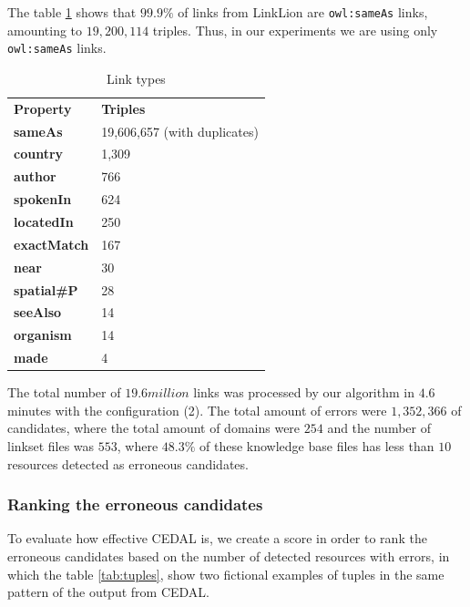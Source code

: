  The table \ref{tab:linkTypes} shows that $99.9 \%$ of links from LinkLion are \texttt{owl:sameAs} links, amounting to $19,200,114$ triples. Thus, in our experiments we are using only \texttt{owl:sameAs} links. 

 \begin{table}[H]
 	\centering
 	\caption{Link types}
 	\label{tab:linkTypes}
 	\begin{tabular}{ll}
 		\hline\noalign{\smallskip}
 		\textbf{Property}   & \textbf{Triples}  \\
 		\noalign{\smallskip}
 		\hline
 		\textbf{sameAs}     & 19,606,657 (with duplicates)    \\
 		\textbf{country}    & 1,309                 \\
 		\textbf{author}     & 766              \\
 		\textbf{spokenIn}   & 624                  \\
 		\textbf{locatedIn}  & 250                  \\
 		\textbf{exactMatch} & 167                 \\
 		\textbf{near}       & 30                   \\
 		\textbf{spatial\#P} & 28                   \\
 		\textbf{seeAlso}    & 14             \\
 		\textbf{organism}   & 14      \\
 		\textbf{made}       & 4                \\
 		\hline           
 	\end{tabular}
 \end{table}

 The total number of $19.6 million$ links was processed by our algorithm in $4.6$ minutes with the configuration (2). The total amount of errors were $1,352,366$ of candidates, where the total amount of domains were $254$ and  the number of linkset files was $553$, where $48.3\%$ of these knowledge base files has less than $10$ resources detected as erroneous candidates. 

 \subsubsection{Ranking the erroneous candidates}

 To evaluate how effective CEDAL is, we create a score in order to rank the erroneous candidates based on the number of detected resources with errors, in which the table \ref{tab:tuples}, show two fictional examples of tuples in the same pattern of the output from CEDAL.

